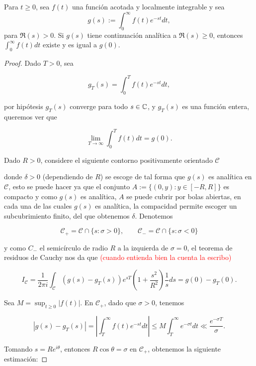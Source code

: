 \begin{theorem}
    Para $t \geq 0$, sea $f(t)$ una función acotada y localmente integrable y sea $$g(s):=\displaystyle\int_0^{\infty} f(t) e^{-s t} d t,$$
     para $\Re(s)>0$. Si $g(s)$ tiene continuación analítica a $\Re(s) \geq 0$, entonces $\displaystyle\int_0^{\infty} f(t) d t$ existe y es igual a $g(0)$.
\end{theorem}

\begin{proof}
    Dado $T>0$, sea

    $$g_T(s)=\int_0^Tf(t)e^{-st}dt,$$

    por hipótesis $g_T(s)$ converge para todo $s\in \mathbb{C}$, y $g_T(s)$ es una función entera, queremos ver que 

    $$\lim_{T \to \infty} \int_0^T f(t)dt=g(0).$$
 
    Dado $R>0$, considere el siguiente contorno positivamente orientado $\mathscr{C}$

    \begin{center}
    
    \end{center}

    donde $\delta>0$ (dependiendo de $R$) se escoge de tal forma que $g(s)$ es analítica en $\mathscr{C}$, esto se puede hacer ya que el conjunto $A:=\{(0,y): y\in [-R,R]\}$ es compacto y como $g(s)$ es analítica, $A$ se puede cubrir por bolas abiertas, en cada una de las cuales $g(s)$ es analítica, la compacidad permite escoger un subcubrimiento finito, del que obtenemos $\delta$.  Denotemos

    $$\mathscr{C}_+=\mathscr{C}\cap \{s:\sigma>0\},\quad \quad \mathscr{C}_-=\mathscr{C}\cap \{s:\sigma<0\}$$

    y como $C_-$ el semicírculo de radio $R$ a la izquierda de $\sigma=0$, el teorema de residuos de Cauchy nos da que \textcolor{red}{(cuando entienda bien la cuenta la escribo)}

    $$I_{\mathscr{C}}=\frac{1}{2\pi i}\int_{\mathscr{C}}\left(g(s)-g_T(s)\right)e^{sT}\left(1+\frac{s^2}{R^2}\right)\frac{1}{s}ds=g(0)-g_T(0).$$

    Sea $M = \sup _{t \geq 0}|f(t)|$. En $\mathscr{C}_{+}$, dado que $\sigma > 0$, tenemos

\[
\left|g(s)-g_T(s)\right| = \left|\int_T^{\infty} f(t) e^{-s t} d t\right| \leq M \int_T^{\infty} e^{-\sigma t} d t \ll \frac{e^{-\sigma T}}{\sigma}.
\]

Tomando $s = R e^{i \theta}$, entonces $R \cos \theta = \sigma$ en $\mathscr{C}_{+}$, obtenemos la siguiente estimación:


\end{proof}
